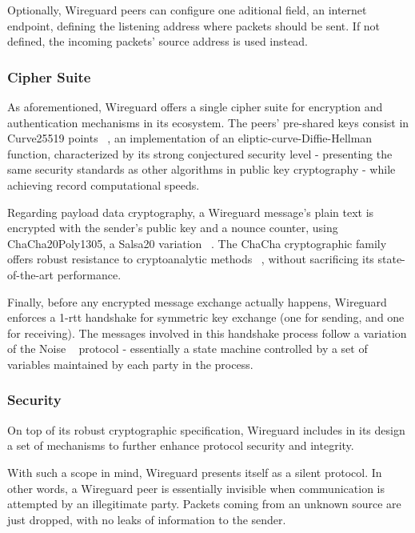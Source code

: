\documentclass[11pt,twoside,a4paper]{report}
\begin{document}
Optionally, Wireguard peers can configure one aditional field, an internet endpoint, defining the listening address where packets should be sent. If not defined, the incoming packets' source address is used instead.

\subsubsection{Cipher Suite}

As aforementioned, Wireguard offers a single cipher suite for encryption and authentication mechanisms in its ecosystem. The peers' pre-shared keys consist in  Curve25519 points ~\cite{bernstein2006curve25519}, an implementation of an eliptic-curve-Diffie-Hellman function, characterized by its strong conjectured security level - presenting the same security standards as other algorithms in public key cryptography - while achieving record computational speeds.

Regarding payload data cryptography, a Wireguard message's plain text is encrypted with the sender's public key and a nounce counter, using ChaCha20Poly1305, a Salsa20 variation ~\cite{bernstein2008chacha}. The ChaCha cryptographic family offers robust resistance to cryptoanalytic methods ~\cite{cryptoeprint:2014/613}, without sacrificing its state-of-the-art performance.

Finally, before any encrypted message exchange actually happens, Wireguard enforces a 1-\acrshort{rtt} handshake for symmetric key exchange (one for sending, and one for receiving). The messages involved in this handshake process follow a variation of the Noise ~\cite{perrin2018noise} protocol - essentially a state machine controlled by a set of variables maintained by each party in the process.

\subsubsection{Security}

On top of its robust cryptographic specification, Wireguard includes in its design a set of mechanisms to further enhance protocol security and integrity.

With such a scope in mind, Wireguard presents itself as a silent protocol. In other words, a Wireguard peer is essentially invisible when communication is attempted by an illegitimate party. Packets coming from an unknown source are just dropped, with no leaks of information to the sender.
\end{document}
